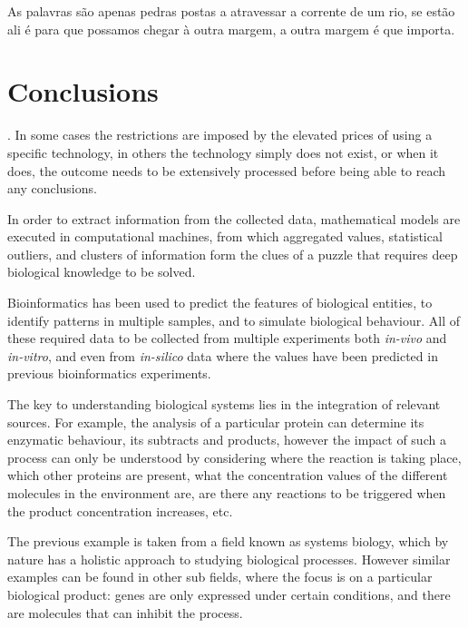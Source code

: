 \begin{savequote}[75mm] 
As palavras são apenas pedras postas a atravessar a corrente de um rio, se estão ali é para que possamos chegar à outra margem, a outra margem é que importa.
\end{savequote}

\chapter{Conclusions}

. In some cases the restrictions are imposed by the elevated prices of using a specific technology, in others the technology simply does not exist, or when it does, the outcome needs to be extensively processed before being able to reach any conclusions. 

In order to extract information from the collected data, mathematical models are executed in computational machines, from which aggregated values, statistical outliers, and clusters of information form the clues of a puzzle that requires deep biological knowledge to be solved.

Bioinformatics has been used to predict the features of biological entities, to identify patterns in multiple samples, and to simulate biological behaviour. All of these required data to be collected from multiple experiments both \emph{in-vivo} and \emph{in-vitro}, and even from \emph{in-silico} data where the values have been predicted in previous bioinformatics experiments.

The key to understanding biological systems lies in the integration of relevant sources. For example,  the analysis of a particular protein can determine its enzymatic behaviour, its subtracts and products, however the impact of such a process can only be understood by considering where the reaction is taking place, which other proteins are present, what the concentration values of the different molecules in the environment are, are there any reactions to be triggered when the product concentration increases, etc.

The previous example is taken from a field known as systems biology, which by nature has a holistic approach to studying biological processes. However similar examples can be found in other sub fields, where the focus is on a particular biological product: genes are only expressed under certain conditions, and there are molecules that can inhibit the process.

